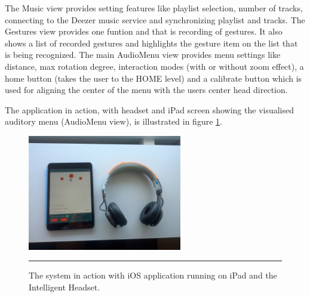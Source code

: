 The Music view provides setting features like playlist selection, number of tracks, connecting to the Deezer music service and synchronizing playlist and tracks. The Gestures view provides one funtion and that is recording of gestures. It also shows a list of recorded gestures and highlights the gesture item on the list that is being recognized. The main AudioMenu view provides menu settings like distance, max rotation degree, interaction modes (with or without zoom effect), a home button (takes the user to the HOME level) and a calibrate button which is used for aligning the center of the menu with the users center head direction.

The application in action, with headset and iPad screen showing the visualised auditory menu (AudioMenu view), is illustrated in figure \ref{fig:implementationsystem}.

\begin{figure}[t]
  \centering
    \includegraphics[width=0.6\textwidth,height=\textheight,keepaspectratio]{./Figures/system_final.jpg}
    \rule{35em}{1pt}
  \caption[Final system in action]{The system in action with iOS application running on iPad and the Intelligent Headset.}
  \label{fig:implementationsystem}
\end{figure}







